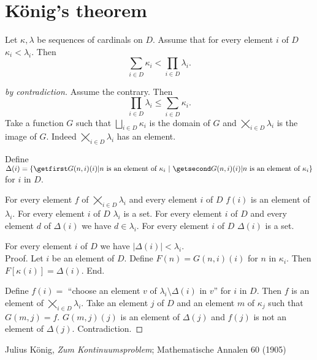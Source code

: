 \documentclass{article}
\newcommand{\SumSet}[2]{\bigsqcup_{i \in #2} #1_{i}}
\newcommand{\Sum}[2]{\sum_{i \in #2} #1_{i}}
\newcommand{\ProdSet}[2]{\bigtimes_{i \in #2} #1_{i}}
\newcommand{\Prod}[2]{\prod_{i \in #2} #1_{i}}
\begin{document}
\section{König's theorem}

\begin{forthel}
  \begin{theorem}[König]\label{koenig}
    Let $\kappa, \lambda$ be sequences of cardinals on $D$.
    Assume that for every element $i$ of $D$ $\kappa_{i} < \lambda_{i}$.
    Then \[ \Sum{\kappa}{D} < \Prod{\lambda}{D}. \]
  \end{theorem}
  \begin{proof}[by contradiction]
    Assume the contrary.
    Then \[ \Prod{\lambda}{D} \leq \Sum{\kappa}{D}. \]
    Take a function $G$ such that $\SumSet{\kappa}{D}$ is the domain of $G$ and
    $\ProdSet{\lambda}{D}$ is the image of $G$.
    Indeed $\ProdSet{\lambda}{D}$ has an element.

    Define $\Delta(i) = \class{G(n,i)(i) | \text{$n$ is an element of
    $\kappa_{i}$}}$ for $i$ in $D$.

    For every element $f$ of $\ProdSet{\lambda}{D}$ and every element $i$ of $D$
    $f(i)$ is an element of $\lambda_{i}$.
    For every element $i$ of $D$ $\lambda_{i}$ is a set.
    For every element $i$ of $D$ and every element $d$ of $\Delta(i)$ we have
    $d\in \lambda_{i}$.
    For every element $i$ of $D$ $\Delta(i)$ is a set.

    For every element $i$ of $D$ we have $|\Delta(i)| < \lambda_{i}$. \\
    Proof.
      Let $i$ be an element of $D$.
      Define $F(n) = G(n,i)(i)$ for $n$ in $\kappa_{i}$.
      Then $F[\kappa(i)] = \Delta(i)$.
    End.

    Define $f(i) =$ ``choose an element $v$ of $\lambda_{i} \setminus
    \Delta(i)$ in $v$'' for $i$ in $D$.
    Then $f$ is an element of $\ProdSet{\lambda}{D}$.
    Take an element $j$ of $D$ and an element $m$ of $\kappa_{j}$ such that
    $G(m,j) = f$.
    $G(m,j)(j)$ is an element of $\Delta(j)$ and $f(j)$ is not an element of
    $\Delta(j)$.
    Contradiction.
  \end{proof}
\end{forthel}

\begin{thebibliography}{1}
   Julius König,
  \textit{Zum Kontinuumsproblem};
  Mathematische Annalen 60 (1905)
\end{thebibliography}
\end{document}
